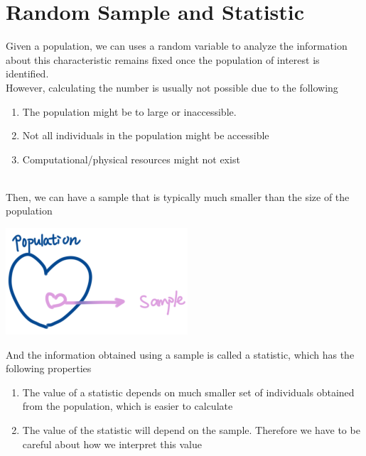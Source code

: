 \documentclass[11pt,oneside]{book}
\theoremstyle{break}
\theoremstyle{break}
\begin{document}
\chapter[Random Sample, Statistic, and Central Limit Theorem]{Random Sample and Statistic}
Given a population, we can uses a random variable to analyze the information about this characteristic remains fixed once the population of interest is identified.\\
However, calculating the number is usually not possible due to the following \\
 \begin{enumerate}[topsep=0pt,itemsep=-1ex,partopsep=1ex,parsep=1ex]
\item The population might be to large or inaccessible.
\item Not all individuals in the population might be accessible
\item Computational/physical resources might not exist
\end{enumerate}
\hfill\\
Then, we can have a sample that is typically much smaller than the size of the population\begin{center}
\includegraphics[scale=0.6]{figures/sample_popilation}
\end{center}
And the information obtained using a sample is called a statistic, which has the following properties \begin{enumerate}[topsep=0pt,itemsep=-1ex,partopsep=1ex,parsep=1ex]
\item The value of a statistic depends on much smaller set of individuals obtained from the population, which is easier to calculate
\item The value of the statistic will depend on the sample. Therefore we have to be careful about how we interpret this value 
\end{enumerate}
\hfill\\
\end{document}
